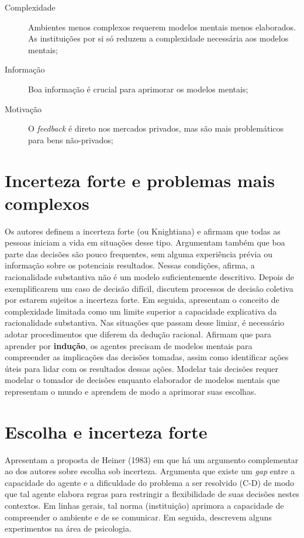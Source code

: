 \documentclass[11pt,lineno]{../style}
\begin{document}
\begin{description}
	\item[Complexidade] Ambientes menos complexos requerem modelos mentais menos elaborados. As instituições por si só reduzem a complexidade necessária aos modelos mentais;
	\item[Informação] Boa informação é crucial para aprimorar os modelos mentais;
	\item[Motivação] O \textit{feedback} é direto nos mercados privados, mas são mais problemáticos para bens não-privados;
\end{description}

\section{Incerteza forte e problemas mais complexos}

Os autores definem a incerteza forte (ou Knightiana) e afirmam que todas as pessoas iniciam a vida em situações desse tipo. Argumentam também que boa parte das decisões são pouco frequentes, sem alguma experiência prévia ou informação sobre os potenciais resultados. Nessas condições, afirma, a racionalidade substantiva não é um modelo suficientemente descritivo. Depois de exemplificarem um caso de decisão difícil, discutem processos de decisão coletiva por estarem sujeitos a incerteza forte. Em seguida, apresentam o conceito de complexidade limitada como um limite superior a capacidade explicativa da racionalidade substantiva. Nas situações que passam desse limiar, é necessário adotar procedimentos que diferem da dedução racional. Afirmam que para aprender por \textbf{indução}, os agentes precisam de modelos mentais para compreender as implicações das decisões tomadas, assim como identificar ações úteis para lidar com os resultados dessas ações. Modelar tais decisões requer modelar o tomador de decisões enquanto elaborador de modelos mentais que representam o mundo e aprendem de modo a aprimorar suas escolhas.

\section{Escolha e incerteza forte}

Apresentam a proposta de Heiner (1983) em que há um argumento complementar ao dos autores sobre escolha sob incerteza. Argumenta que existe um \textit{gap} entre a capacidade do agente e a dificuldade do problema a ser resolvido (C-D) de modo que tal agente elabora regras para restringir a flexibilidade de suas decisões nestes contextos. Em linhas gerais, tal norma (instituição) aprimora a capacidade de compreender o ambiente e de se comunicar. Em seguida, descrevem alguns experimentos na área de psicologia.
\end{document}
